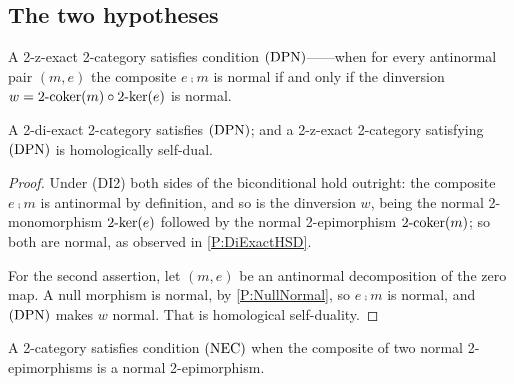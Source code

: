 \subsection{The two hypotheses}\label{SS:NSDHypotheses}

\begin{definition}
  \label{Def:DPN}  \leanok
  A 2-z-exact 2-category satisfies condition \(\textup{(DPN)}\)------when for every antinormal pair \((m,e)\) the composite \(e\comp m\) is normal if and only if the dinversion \(w=2\text{-}\mathrm{coker}(m)\circ2\text{-}\mathrm{ker}(e)\) is normal.
\end{definition}

\begin{proposition}
  \label{P:DPNPlace}   \leanok
  A 2-di-exact 2-category satisfies \(\textup{(DPN)}\); and a 2-z-exact 2-category satisfying \(\textup{(DPN)}\) is homologically self-dual.
\end{proposition}

\begin{proof}
  \leanok
  Under \textup{(DI2)} both sides of the biconditional hold outright: the composite \(e\comp m\) is antinormal by definition, and so is the dinversion \(w\), being the normal 2-monomorphism \(2\text{-}\mathrm{ker}(e)\) followed by the normal 2-epimorphism \(2\text{-}\mathrm{coker}(m)\); so both are normal, as observed in \prox\ref{P:DiExactHSD}.

	For the second assertion, let \((m,e)\) be an antinormal decomposition of the zero map. A null morphism is normal, by \prox\ref{P:NullNormal}, so \(e\comp m\) is normal, and \(\textup{(DPN)}\) makes \(w\) normal. That is homological self-duality.
\end{proof}

\begin{definition}
  \label{Def:NEC}  \leanok
  A 2-category satisfies condition \(\textup{(NEC)}\) when the composite of two normal 2-epimorphisms is a normal 2-epimorphism.
\end{definition}

